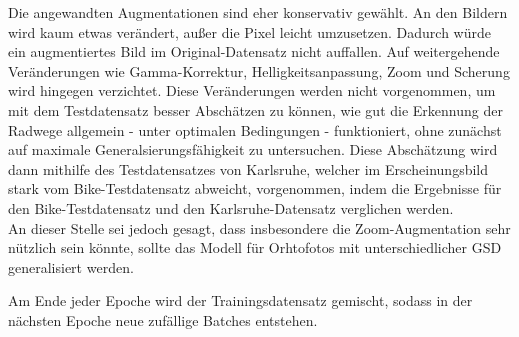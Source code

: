 Die angewandten Augmentationen sind eher konservativ gewählt. An den Bildern wird kaum etwas verändert, 
außer die Pixel leicht umzusetzen. Dadurch würde ein augmentiertes Bild im Original-Datensatz nicht auffallen. 
Auf weitergehende Veränderungen wie Gamma-Korrektur, Helligkeitsanpassung, Zoom und Scherung wird hingegen verzichtet. 
Diese Veränderungen werden nicht vorgenommen, um mit dem Testdatensatz besser Abschätzen zu können, 
wie gut die Erkennung der Radwege allgemein - unter optimalen Bedingungen - funktioniert, ohne zunächst auf 
maximale Generalsierungsfähigkeit zu untersuchen. Diese Abschätzung wird dann mithilfe des Testdatensatzes von 
Karlsruhe, welcher im Erscheinungsbild stark vom Bike-Testdatensatz abweicht, vorgenommen, 
indem die Ergebnisse für den Bike-Testdatensatz und den Karlsruhe-Datensatz verglichen werden. \\
An dieser Stelle sei jedoch gesagt, dass insbesondere die Zoom-Augmentation sehr nützlich sein könnte, 
sollte das Modell für Orhtofotos mit unterschiedlicher \ac{GSD} generalisiert werden. 

Am Ende jeder Epoche wird der Trainingsdatensatz gemischt, sodass in der nächsten Epoche neue zufällige 
Batches entstehen. 

